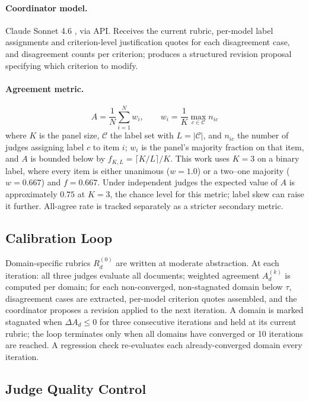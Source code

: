 \documentclass[letterpaper]{article}
\begin{document}
\paragraph{Coordinator model.}
Claude Sonnet 4.6 \citep{anthropic2026sonnet46}, via API. Receives the
current rubric, per-model label assignments and criterion-level justification
quotes for each disagreement case, and disagreement counts per criterion;
produces a structured revision proposal specifying which criterion to modify.

\paragraph{Agreement metric.}
\begin{equation}
A = \frac{1}{N}\sum_{i=1}^{N} w_i,
\qquad
w_i = \frac{1}{K}\max_{c \in \mathcal{C}} n_{ic}
\label{eq:agree}
\end{equation}
where $K$ is the panel size, $\mathcal{C}$ the label set with $L = |\mathcal{C}|$,
and $n_{ic}$ the number of judges assigning label $c$ to item $i$; $w_i$ is the
panel's majority fraction on that item, and $A$ is bounded below by
$f_{K,L} = \lceil K/L \rceil / K$. This work uses $K = 3$ on a binary label,
where every item is either unanimous ($w = 1.0$) or a two--one majority
($w = 0.667$) and $f = 0.667$. Under independent judges the expected value of
$A$ is approximately $0.75$ at $K = 3$, the chance level for this metric; label
skew can raise it further. All-agree rate is tracked separately as a stricter
secondary metric.

\subsection{Calibration Loop}

Domain-specific rubrics $R^{(0)}_d$ are written at moderate abstraction. At
each iteration: all three judges evaluate all documents; weighted agreement
$A^{(k)}_d$ is computed per domain; for each non-converged, non-stagnated
domain below $\tau$, disagreement cases are extracted, per-model criterion
quotes assembled, and the coordinator proposes a revision applied to the next
iteration. A domain is marked stagnated when $\Delta A_d \leq 0$ for three
consecutive iterations and held at its current rubric; the loop terminates
only when all domains have converged or 10 iterations are reached. A
regression check re-evaluates each already-converged domain every iteration.

\subsection{Judge Quality Control}
\end{document}
